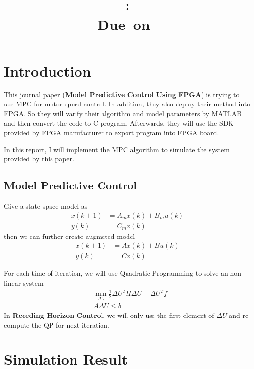\documentclass{article}
\title{
    \vspace{2in}
    \textmd{\textbf{\hmwkClass}}\\
    \textmd{\textbf{\hmwkID: \hmwkTitle}} \\
    \normalsize\vspace{0.1in}\small{Due\ on\ \hmwkDueDate}\\
    \vspace{3in}
}
\author{\textbf{\hmwkAuthorName}}
\date{} %
\begin{document}
\maketitle
\newpage

\section{Introduction}
This journal paper (\textbf{Model Predictive Control Using FPGA}) is trying to use MPC for motor speed control. In addition, they also deploy their
method into FPGA. So they will varify their algorithm and model parameters by MATLAB and then convert the code to C program. Afterwards,
they will use the SDK provided by FPGA manufacturer to export program into FPGA board.

In this report, I will implement the MPC algorithm to simulate the system provided by this paper.

\subsection{Model Predictive Control}
Give a state-space model as
\begin{align}
    x(k+1) &= A_mx(k) + B_mu(k) \\
    y(k) &= C_mx(k)
\end{align}
then we can further create augmeted model
\begin{align}
    x(k+1) &= Ax(k) + Bu(k) \\
    y(k) &= Cx(k)
\end{align}

For each time of iteration, we will use Quadratic Programming to solve an non-linear system
\begin{align}
    & \min_{\Delta U}{\frac{1}{2}\Delta U^TH\Delta U + \Delta U^Tf} \\
    & A\Delta U \leq b
\end{align}
In \textbf{Receding Horizon Control}, we will only use the first element of $\Delta U$ and re-compute the QP for next iteration.

\section{Simulation Result}
\end{document}
